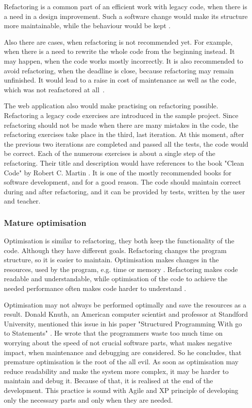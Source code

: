 Refactoring is a common part of an efficient work with legacy code, when there is a need in a design improvement. Such a software change would make its structure more maintainable, while the behaviour would be kept \cite{lc_effectively}.

Also there are cases, when refactoring is not recommended yet. For example, when there is a need to rewrite the whole code from the beginning instead. It may happen, when the code works mostly incorrectly. It is also recommended to avoid refactoring, when the deadline is close, because refactoring may remain unfinished. It would lead to a raise in cost of maintenance as well as the code, which was not reafactored at all~\cite[Preface]{ref_debt}.

The web application also would make practising on refactoring possible. Refactoring a legacy code exercises are introduced in the sample project. Since refactoring should not be made when there are many mistakes in the code, the refactoring exercises take place in the third, last iteration. At this moment, after the previous two iterations are completed and passed all the tests, the code would be correct. Each of the numerous exercises is about a single step of the refactoring. Their title and description would have references to the book "Clean Code" by Robert C. Martin \cite{clean_code}. It is one of the mostly recommended books for software development, and for a good reason. The code should maintain correct during and after refactoring, and it can be provided by tests, written by the user and teacher.

\subsubsection{Mature optimisation}
Optimisation is similar to refactoring, they both keep the functionality of the code. Although they have different goals. Refactoring changes the program structure, so it is easier to maintain. Optimisation makes changes in the resources, used by the program, e.g. time or memory \cite{lc_effectively}. Refactoring makes code readable and understandable, while optimisation of the code to achieve the needed performance often makes code harder to understand \cite{ref_ec}.

Optimisation may not always be performed optimally and save the resources as a result. Donald Knuth, an American computer scientist and professor at Standford University, mentioned this issue in his paper "Structured Programming With go to Statements" \cite{knuth_goto}. He wrote that the programmers waste too much time on worrying about the speed of not crucial software parts, what makes negative impact, when maintenance and debugging are considered. So he concludes, that premature optimisation is the root of the all evil. As soon as optimisation may reduce readability and make the system more complex, it may be harder to maintain and debug it. Because of that, it is realised at the end of the development. This practice is sound with Agile and XP principle of developing only the necessary parts and only when they are needed.

